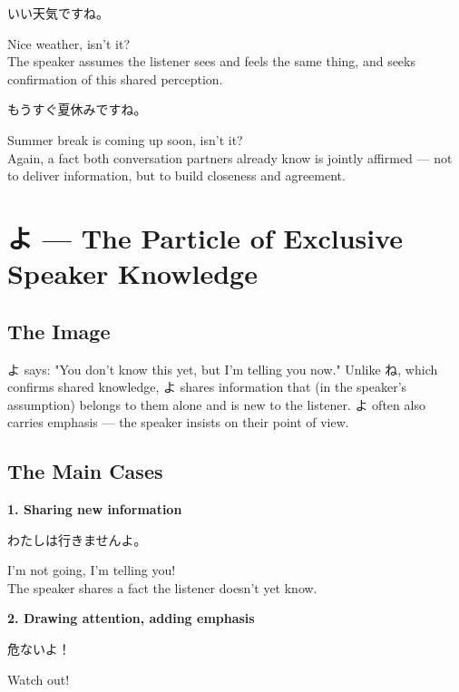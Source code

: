 \documentclass[12pt]{book}
\begin{document}
\par\quad いい天気ですね。\\
\par\quad Nice weather, isn't it?\\

The speaker assumes the listener sees and feels the same thing, and seeks confirmation of this shared perception.

\par\quad もうすぐ夏休みですね。\\
\par\quad Summer break is coming up soon, isn't it?\\

Again, a fact both conversation partners already know is jointly affirmed — not to deliver information, but to build closeness and agreement.


\chapter{よ — The Particle of Exclusive Speaker Knowledge}

\section*{The Image}

よ says: "You don't know this yet, but I'm telling you now." Unlike ね, which confirms shared knowledge, よ shares information that (in the speaker's assumption) belongs to them alone and is new to the listener. よ often also carries emphasis — the speaker insists on their point of view.

\section*{The Main Cases}

\textbf{1. Sharing new information}
\par\quad わたしは行きませんよ。\\
\par\quad I'm not going, I'm telling you!\\

The speaker shares a fact the listener doesn't yet know.

\textbf{2. Drawing attention, adding emphasis}
\par\quad 危ないよ！\\
\par\quad Watch out!\\
\end{document}
